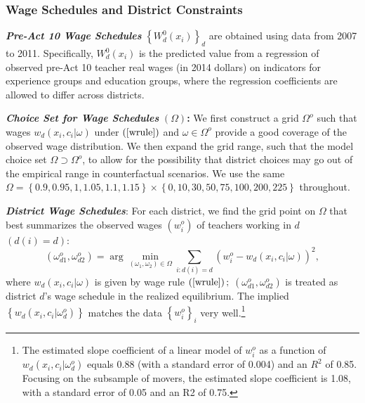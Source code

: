 \documentclass[notitlepage,12pt]{article}%
\begin{document}
\subsubsection{Wage Schedules and District Constraints\label{wage_emp}}

\medskip\noindent\textit{\textbf{Pre-Act 10 Wage Schedules }}$\left\{
W_{d}^{0}\left(  x_{i}\right)  \right\}  _{d}$ are obtained using data from
2007 to 2011. Specifically, $W_{d}^{0}\left(  x_{i}\right)  $ is the predicted
value from a regression of observed pre-Act 10 teacher real wages (in 2014
dollars) on indicators for experience groups and education groups, where the
regression coefficients are allowed to differ across districts$.$

\medskip\noindent\textit{\textbf{Choice Set for Wage Schedules }}$\left(
\Omega\right)  $\textbf{: }We first construct a grid $\Omega^{o}$ such that
wages $w_{d}\left(  x_{i},c_{i}|\omega\right)  $ under $\left(  \ref{wrule}%
\right)  $ and $\omega\in\Omega^{o}$ provide a good coverage of the observed
wage distribution. We then expand the grid range, such that the model choice
set $\Omega\supset\Omega^{o}$, to allow for the possibility that district
choices may go out of the empirical range in counterfactual scenarios. We use
the same $\Omega=\left\{  0.9,0.95,1,1.05,1.1,1.15\right\}  \times\left\{
0,10,30,50,75,100,200,225\right\}  $ throughout.

\medskip\noindent\textit{\textbf{District Wage Schedules}}: For each district,
we find the grid point on $\Omega$ that best summarizes the observed wages
$\left(  w_{i}^{o}\right)  $ of teachers working in $d$ $\left(
d(i)=d\right)  $:
\[
(\omega_{d1}^{o},\omega_{d2}^{o})=\arg\min_{(\omega_{1},\omega_{2})\in\Omega
}\sum_{i:d(i)=d}\left(  w_{i}^{o}-w_{d}\left(  x_{i},c_{i}|\omega\right)
\right)  ^{2},
\]
where $w_{d}\left(  x_{i},c_{i}|\omega\right)  $ is given by wage rule
$\left(  \ref{wrule}\right)  ;$ $\left(  \omega_{d1}^{o},\omega_{d2}%
^{o}\right)  $ is treated as district $d$'s wage schedule in the realized
equilibrium. The implied $\left\{  w_{d}\left(  x_{i},c_{i}|\omega_{d}%
^{o}\right)  \right\}  $ matches the data $\left\{  w_{i}^{o}\right\}  _{i}$
very well.\footnote{The estimated slope coefficient of a linear model of
$w_{i}^{o}$ as a function of $w_{d}\left(  x_{i},c_{i}|\omega_{d}^{o}\right)
$ equals 0.88 (with a standard error of 0.004) and an $R^{2}$ of 0.85.
Focusing on the subsample of movers, the estimated slope coefficient is 1.08,
with a standard error of 0.05 and an R2 of 0.75.}
\end{document}
